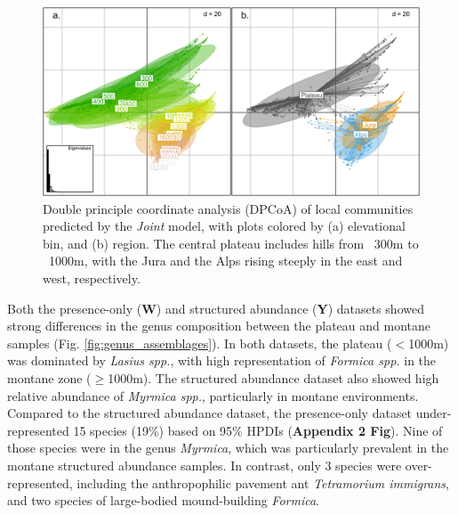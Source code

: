 \documentclass[preprint,review,times,12pt]{elsarticle}
\begin{document}
\begin{figure}
	\centering\includegraphics[width=5in]{ms/1_Ecography/1/figs/DPCoA.png}
	\caption{\label{fig:dpcoa} Double principle coordinate analysis (DPCoA) of local communities predicted by the \emph{Joint} model, with plots colored by (a) elevational bin, and (b) region. The central plateau includes hills from ~300m to ~1000m, with the Jura and the Alps rising steeply in the east and west, respectively. }
\end{figure}

Both the presence-only (\textbf{W}) and structured abundance (\textbf{Y}) datasets showed strong differences in the genus composition between the plateau and montane samples (Fig. \ref{fig:genus_assemblages}). In both datasets, the plateau ($<$1000m) was dominated by \emph{Lasius spp.}, with high representation of \emph{Formica spp.} in the montane zone ($\geq$1000m). The structured abundance dataset also showed high relative abundance of \emph{Myrmica spp.}, particularly in montane environments. Compared to the structured abundance dataset, the presence-only dataset under-represented 15 species (19\%) based on 95\% HPDIs (\textbf{Appendix 2 Fig}). Nine of those species were in the genus \emph{Myrmica}, which was particularly prevalent in the montane structured abundance samples. In contrast, only 3 species were over-represented, including the anthropophilic pavement ant \emph{Tetramorium immigrans}, and two species of large-bodied mound-building \emph{Formica}. 
\end{document}
